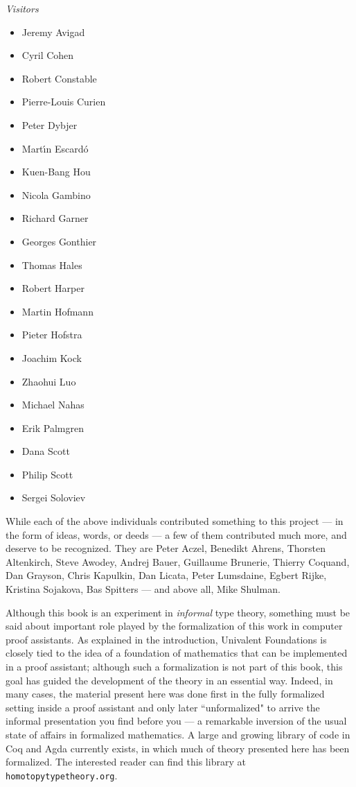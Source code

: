 {%
\centerline{\emph{Visitors}}
%
\begin{multicols}{3}{
\begin{itemize}
\item[] Jeremy Avigad
\item[] Cyril Cohen
\item[] Robert Constable
\item[] Pierre-Louis Curien
\item[] Peter Dybjer
\item[] Mart{\'\i}n Escard{\'o}
\item[] Kuen-Bang Hou
\item[] Nicola Gambino
\item[] Richard Garner
\item[] Georges Gonthier
\item[] Thomas Hales
\item[] Robert Harper
\item[] Martin Hofmann
\item[] Pieter Hofstra
\item[] Joachim Kock
\item[] Zhaohui Luo
\item[] Michael Nahas
\item[] Erik Palmgren
\item[] Dana Scott
\item[] Philip Scott
\item[] Sergei Soloviev
\end{itemize}
}
\end{multicols}

\noindent While each of the above individuals contributed something to this project --- in the form of ideas, words, or deeds --- a few of them contributed much more, and deserve to be recognized.  They are Peter Aczel, Benedikt Ahrens, Thorsten Altenkirch,  Steve Awodey, Andrej Bauer, Guillaume Brunerie, Thierry Coquand, Dan Grayson, Chris Kapulkin, Dan Licata, Peter Lumsdaine, Egbert Rijke, Kristina Sojakova, Bas Spitters --- and above all, Mike Shulman.


Although this book is an experiment in \emph{informal} type theory, something must be said about important role played by the formalization of this work in  computer proof assistants.  As explained in the introduction, Univalent Foundations is closely tied to the idea of a foundation of mathematics that can be implemented in a proof assistant; although such a formalization is not part of this book, this goal has guided the development of the theory in an essential way. Indeed, in many cases, the material present here was done first in the fully formalized setting inside a proof assistant and only later ``unformalized" to arrive the informal presentation you find before you --- a remarkable inversion of the usual state of affairs in formalized mathematics.   A large and growing library of code in Coq and Agda currently exists, in which much of theory presented here has been formalized.  The interested reader can find this library at {\tt homotopytypetheory.org}.

}
